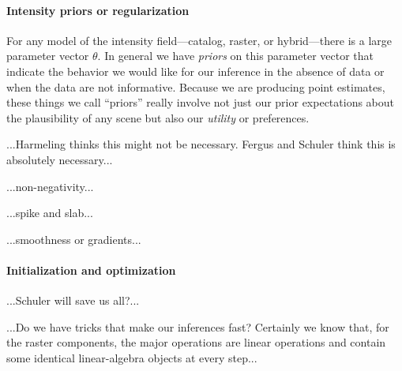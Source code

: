\documentclass[12pt]{article}
\begin{document}
\paragraph{Intensity priors or regularization}

For any model of the intensity field---catalog, raster, or
hybrid---there is a large parameter vector $\theta$.  In general we
have \emph{priors} on this parameter vector that indicate the behavior
we would like for our inference in the absence of data or when the
data are not informative.  Because we are producing point estimates,
these things we call ``priors'' really involve not just our prior
expectations about the plausibility of any scene but also our
\emph{utility} or preferences.

...Harmeling thinks this might not be necessary.  Fergus and Schuler
think this is absolutely necessary...

...non-negativity...

...spike and slab...

...smoothness or gradients...

\paragraph{Initialization and optimization}

...Schuler will save us all?...

...Do we have tricks that make our inferences fast?  Certainly we know
that, for the raster components, the major operations are linear
operations and contain some identical linear-algebra objects at every
step...
\end{document}
